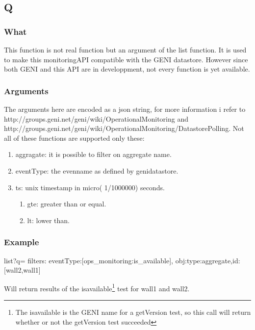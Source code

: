 \begin{otherlanguage}{english}
\subsection{Q}
\subsubsection{What}
This function is not real function but an argument of the list function. It is used to make this monitoringAPI compatible with the GENI datastore. However since both GENI and this API are in developpment, not every function is yet available.
\subsubsection{Arguments}
The arguments here are encoded as a json string, for more information i refer to\\
http://groups.geni.net/geni/wiki/OperationalMonitoring and\\
http://groups.geni.net/geni/wiki/OperationalMonitoring/DatastorePolling.
\npar
Not all of these functions are supported only these:
\begin{enumerate}
\item aggragate: it is possible to filter on aggregate name.
\item eventType: the evenname as defined by genidatastore. 
\item ts: unix timestamp in micro( 1/1000000) seconds.
\begin{enumerate}
\item gte: greater than or equal.
\item lt: lower than.
\end{enumerate}
\end{enumerate}
\subsubsection{Example}
\begin{lt}
list?q={
  filters:{
    eventType:[ops_monitoring:is_available],
    obj:{type:aggregate,id:[wall2,wall1]}
  }
}
\end{lt}
Will return results of the is\textunderscore available\footnote{The is\textunderscore available is the GENI name for a getVersion test, so this call will return whether or not the getVersion test succeeded} test for wall1 and wall2.
\clearpage
\end{otherlanguage}
